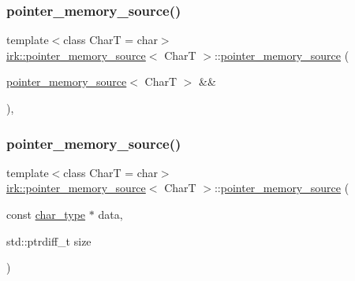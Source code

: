 \subsubsection{\texorpdfstring{pointer\+\_\+memory\+\_\+source()}{pointer\_memory\_source()}\hspace{0.1cm}{\footnotesize\ttfamily [3/4]}}
{\footnotesize\ttfamily template$<$class CharT  = char$>$ \\
\mbox{\hyperlink{classirk_1_1pointer__memory__source}{irk\+::pointer\+\_\+memory\+\_\+source}}$<$ CharT $>$\+::\mbox{\hyperlink{classirk_1_1pointer__memory__source}{pointer\+\_\+memory\+\_\+source}} (\begin{DoxyParamCaption}\item[{\mbox{\hyperlink{classirk_1_1pointer__memory__source}{pointer\+\_\+memory\+\_\+source}}$<$ CharT $>$ \&\&}]{ }\end{DoxyParamCaption})\hspace{0.3cm}{\ttfamily [default]}, {\ttfamily [noexcept]}}

\mbox{\label{classirk_1_1pointer__memory__source_aa38280782ca73eece43d895b7ce12687}} 
\subsubsection{\texorpdfstring{pointer\+\_\+memory\+\_\+source()}{pointer\_memory\_source()}\hspace{0.1cm}{\footnotesize\ttfamily [4/4]}}
{\footnotesize\ttfamily template$<$class CharT  = char$>$ \\
\mbox{\hyperlink{classirk_1_1pointer__memory__source}{irk\+::pointer\+\_\+memory\+\_\+source}}$<$ CharT $>$\+::\mbox{\hyperlink{classirk_1_1pointer__memory__source}{pointer\+\_\+memory\+\_\+source}} (\begin{DoxyParamCaption}\item[{const \mbox{\hyperlink{classirk_1_1pointer__memory__source_a4b778df8efee229fdafbd4de413dbf61}{char\+\_\+type}} $\ast$}]{data,  }\item[{std\+::ptrdiff\+\_\+t}]{size }\end{DoxyParamCaption})\hspace{0.3cm}{\ttfamily [inline]}}

